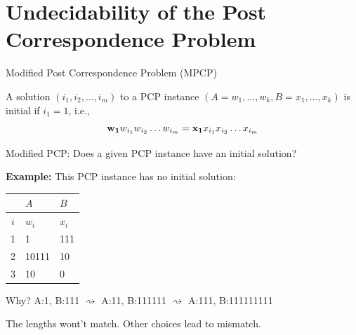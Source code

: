 \documentclass[handout]{beamer}
\begin{document}
\section*{Undecidability of the Post Correspondence Problem}

  
\begin{frame}{Modified Post Correspondence Problem (MPCP)}
    
    A solution $(i_1,i_2,\dots,i_m)$ to a PCP instance $(A=w_1,\ldots, w_k,B=x_1,\ldots, x_k)$ is \alert{initial} if $i_1=1$, i.e., 
    $$
    {\bf w_1}w_{i_1} w_{i_2} \ldots w_{i_m}={\bf x_1}x_{i_1} x_{i_2} \ldots x_{i_m}
    $$
    
    \alert{Modified PCP}: Does a given PCP instance have an \alert{initial} solution?

       
    \textbf{Example:} This PCP instance has no initial solution:

    \begin{center}
        \small
        \begin{tabular}{c | l | l}
            & $A$ & $B$\\
            \hline
            $i$ & $w_i$ & $x_i$ \\
            \hline
            1 & 1 & 111\\
            2 & 10111 & 10\\
            3 & 10 & 0 
        \end{tabular}
    \end{center}

    Why? A:1, B:111 $\rightsquigarrow$ A:11, B:111111 $\rightsquigarrow$ A:111, B:111111111
        
    The lengths wont't match. Other choices lead to mismatch.

\end{frame}
\end{document}
